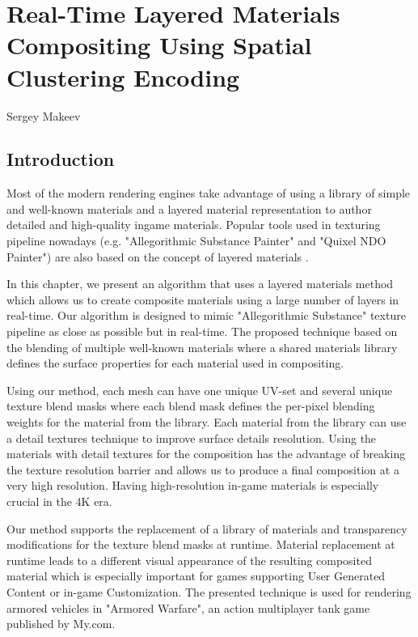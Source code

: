 \chapter{Real-Time Layered Materials Compositing Using Spatial Clustering Encoding}{Sergey Makeev}
 \label{Makeev-chapter}

\section{Introduction}

Most of the modern rendering engines take advantage of using a library of simple and well-known materials and a layered material representation to author detailed and high-quality ingame materials.
Popular tools used in texturing pipeline nowadays (e.g. "Allegorithmic Substance Painter" and "Quixel NDO Painter") are also based on the concept of layered materials
\cite{MaterialsOrder1886,TexturingU4,ShadingUE4}.

In this chapter, we present an algorithm that uses a layered materials method which allows us to create composite materials using a large number of layers in real-time.
Our algorithm is designed to mimic "Allegorithmic Substance" texture pipeline as close as possible but in real-time.
The proposed technique based on the blending of multiple well-known materials where a shared materials library defines the surface properties for each material used in compositing.

Using our method, each mesh can have one unique UV-set and several unique texture blend masks where each blend mask defines the per-pixel blending weights for the material from the library.
Each material from the library can use a detail textures technique to improve surface details resolution.
Using the materials with detail textures for the composition has the advantage of breaking the texture resolution barrier and allows us to produce a final composition at a very high resolution.
Having high-resolution in-game materials is especially crucial in the 4K era.

Our method supports the replacement of a library of materials and transparency modifications for the texture blend masks at runtime.
Material replacement at runtime leads to a different visual appearance of the resulting composited material which is especially important for games supporting User Generated Content or in-game Customization.
The presented technique is used for rendering armored vehicles in "Armored Warfare", an action multiplayer tank game published by My.com.

